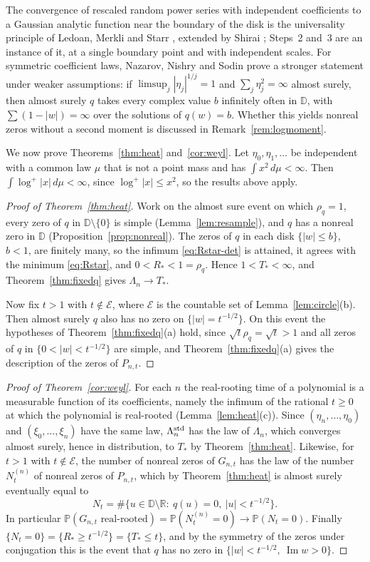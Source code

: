 \documentclass[11pt]{amsart}
\theoremstyle{definition}
\theoremstyle{remark}
\numberwithin{equation}{section}
\newcommand{\R}{\mathbb{R}}
\newcommand{\D}{\mathbb{D}}
\newcommand{\PP}{\mathbb{P}}
\DeclareMathOperator{\im}{Im}
\begin{document}
The convergence of rescaled random power series with independent coefficients to a Gaussian analytic function near the boundary of the disk is the universality principle of Ledoan, Merkli and Starr \cite{LMS}, extended by Shirai \cite{Shi}; Steps~2 and~3 are an instance of it, at a single boundary point and with independent scales. For symmetric coefficient laws, Nazarov, Nishry and Sodin \cite[Theorem~1.3]{NNS} prove a stronger statement under weaker assumptions: if $\limsup_j|\eta_j|^{1/j}=1$ and $\sum_j\eta_j^2=\infty$ almost surely, then almost surely $q$ takes every complex value $b$ infinitely often in $\D$, with $\sum(1-|w|)=\infty$ over the solutions of $q(w)=b$. Whether this yields nonreal zeros without a second moment is discussed in Remark~\ref{rem:logmoment}.

We now prove Theorems~\ref{thm:heat} and~\ref{cor:weyl}. Let $\eta_0,\eta_1,\dots$ be independent with a common law $\mu$ that is not a point mass and has $\int x^2\,d\mu<\infty$. Then $\int\log^+|x|\,d\mu<\infty$, since $\log^+|x|\le x^2$, so the results above apply.

\begin{proof}[Proof of Theorem~\ref{thm:heat}]
Work on the almost sure event on which $\rho_q=1$, every zero of $q$ in $\D\setminus\{0\}$ is simple (Lemma~\ref{lem:resample}), and $q$ has a nonreal zero in $\D$ (Proposition~\ref{prop:nonreal}). The zeros of $q$ in each disk $\{|w|\le b\}$, $b<1$, are finitely many, so the infimum \eqref{eq:Rstar-det} is attained, it agrees with the minimum \eqref{eq:Rstar}, and $0<R_*<1=\rho_q$. Hence $1<T_*<\infty$, and Theorem~\ref{thm:fixedq} gives $\Lambda_n\to T_*$.

Now fix $t>1$ with $t\notin\mathcal E$, where $\mathcal E$ is the countable set of Lemma~\ref{lem:circle}(b). Then almost surely $q$ also has no zero on $\{|w|=t^{-1/2}\}$. On this event the hypotheses of Theorem~\ref{thm:fixedq}(a) hold, since $\sqrt t\rho_q=\sqrt t>1$ and all zeros of $q$ in $\{0<|w|<t^{-1/2}\}$ are simple, and Theorem~\ref{thm:fixedq}(a) gives the description of the zeros of $P_{n,t}$.
\end{proof}

\begin{proof}[Proof of Theorem~\ref{cor:weyl}]
For each $n$ the real-rooting time of a polynomial is a measurable function of its coefficients, namely the infimum of the rational $t\ge0$ at which the polynomial is real-rooted (Lemma~\ref{lem:heat}(c)). Since $(\eta_n,\dots,\eta_0)$ and $(\xi_0,\dots,\xi_n)$ have the same law, $\Lambda_n^{\rm std}$ has the law of $\Lambda_n$, which converges almost surely, hence in distribution, to $T_*$ by Theorem~\ref{thm:heat}. Likewise, for $t>1$ with $t\notin\mathcal E$, the number of nonreal zeros of $G_{n,t}$ has the law of the number $N_t^{(n)}$ of nonreal zeros of $P_{n,t}$, which by Theorem~\ref{thm:heat} is almost surely eventually equal to
\[
N_t=\#\{u\in\D\setminus\R:\ q(u)=0,\ |u|<t^{-1/2}\}.
\]
In particular $\PP(G_{n,t}\text{ real-rooted})=\PP(N_t^{(n)}=0)\to\PP(N_t=0)$. Finally $\{N_t=0\}=\{R_*\ge t^{-1/2}\}=\{T_*\le t\}$, and by the symmetry of the zeros under conjugation this is the event that $q$ has no zero in $\{|w|<t^{-1/2},\ \im w>0\}$.
\end{proof}
\end{document}
